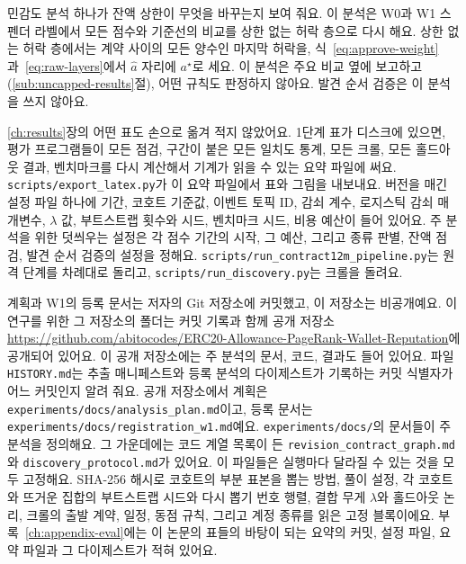 
민감도 분석 하나가 잔액 상한이 무엇을 바꾸는지 보여 줘요. 이 분석은 W0과 W1 스펜더 라벨에서 모든 점수와 기준선의 비교를 상한 없는 허락 층으로 다시 해요. 상한 없는 허락 층에서는 계약 사이의 모든 양수인 마지막 허락을, 식~\eqref{eq:approve-weight}과~\eqref{eq:raw-layers}에서 $\hat a$ 자리에 $a^{\star}$로 세요. 이 분석은 주요 비교 옆에 보고하고(\ref{sub:uncapped-results}절), 어떤 규칙도 판정하지 않아요. 발견 순서 검증은 이 분석을 쓰지 않아요.


\ref{ch:results}장의 어떤 표도 손으로 옮겨 적지 않았어요. 1단계 표가 디스크에 있으면, 평가 프로그램들이 모든 점검, 구간이 붙은 모든 일치도 통계, 모든 크롤, 모든 홀드아웃 결과, 벤치마크를 다시 계산해서 기계가 읽을 수 있는 요약 파일에 써요. \texttt{scripts/export\_latex.py}가 이 요약 파일에서 표와 그림을 내보내요. 버전을 매긴 설정 파일 하나에 기간, 코호트 기준값, 이벤트 토픽 ID, 감쇠 계수, 로지스틱 감쇠 매개변수, $\lambda$ 값, 부트스트랩 횟수와 시드, 벤치마크 시드, 비용 예산이 들어 있어요. 주 분석을 위한 덧씌우는 설정은 각 점수 기간의 시작, 그 예산, 그리고 종류 판별, 잔액 점검, 발견 순서 검증의 설정을 정해요. \texttt{scripts/run\_contract12m\_pipeline.py}는 원격 단계를 차례대로 돌리고, \texttt{scripts/run\_discovery.py}는 크롤을 돌려요.

계획과 W1의 등록 문서는 저자의 Git 저장소에 커밋했고, 이 저장소는 비공개예요. 이 연구를 위한 그 저장소의 폴더는 커밋 기록과 함께 공개 저장소 \url{https://github.com/abitocodes/ERC20-Allowance-PageRank-Wallet-Reputation}에 공개되어 있어요. 이 공개 저장소에는 주 분석의 문서, 코드, 결과도 들어 있어요. 파일 \texttt{HISTORY.md}는 추출 매니페스트와 등록 분석의 다이제스트가 기록하는 커밋 식별자가 어느 커밋인지 알려 줘요. 공개 저장소에서 계획은 \texttt{experiments/docs/analysis\_plan.md}이고, 등록 문서는 \texttt{experiments/docs/registration\_w1.md}예요. \texttt{experiments/docs/}의 문서들이 주 분석을 정의해요. 그 가운데에는 코드 계열 목록이 든 \texttt{revision\_contract\_graph.md}와 \texttt{discovery\_protocol.md}가 있어요. 이 파일들은 실행마다 달라질 수 있는 것을 모두 고정해요. SHA-256 해시로 코호트의 부분 표본을 뽑는 방법, 풀이 설정, 각 코호트와 뜨거운 집합의 부트스트랩 시드와 다시 뽑기 번호 행렬, 결합 무게 $\lambda$와 홀드아웃 논리, 크롤의 출발 계약, 일정, 동점 규칙, 그리고 계정 종류를 읽은 고정 블록이에요. 부록~\ref{ch:appendix-eval}에는 이 논문의 표들의 바탕이 되는 요약의 커밋, 설정 파일, 요약 파일과 그 다이제스트가 적혀 있어요.

